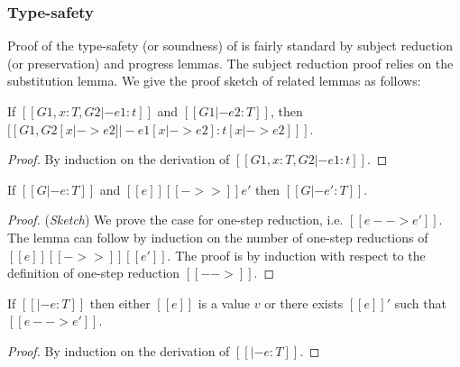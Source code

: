 \subsubsection{Type-safety}
Proof of the type-safety (or soundness) of \ecore is fairly standard by subject reduction (or preservation) and progress lemmas. The subject reduction proof relies on the substitution lemma. We give the proof sketch of related lemmas as follows:

\begin{lem}\label{lem:ecore:subst}
	If $[[G1, x:T, G2 |- e1:t]]$ and $[[G1 |- e2:T]]$, then $[[G1, G2 [x |-> e2] |- e1[x |-> e2]  : t[x |-> e2] ]]$.
\end{lem}

\begin{proof}
    By induction on the derivation of $[[G1, x:T, G2 |- e1:t]]$.
\end{proof}

\begin{lem}\label{lem:ecore:reduct}
If $[[G |- e:T]]$ and $[[e]] [[->>]] e'$ then $[[G |- e':T]]$.
\end{lem}

\begin{proof}
    (\emph{Sketch}) We prove the case for one-step reduction, i.e. $[[e --> e']]$. The lemma can follow by induction on the number of one-step reductions of $[[e]] [[->>]] [[e']]$.
    The proof is by induction with respect to the definition of one-step reduction $[[-->]]$.
\end{proof}

\begin{lem}[Progress]\label{lem:ecore:prog}
If $[[|- e:T]]$ then either $[[e]]$ is a value $v$ or there exists $[[e]]'$ such that $[[e --> e']]$.
\end{lem}

\begin{proof}
    By induction on the derivation of $[[|- e:T]]$.
\end{proof}
